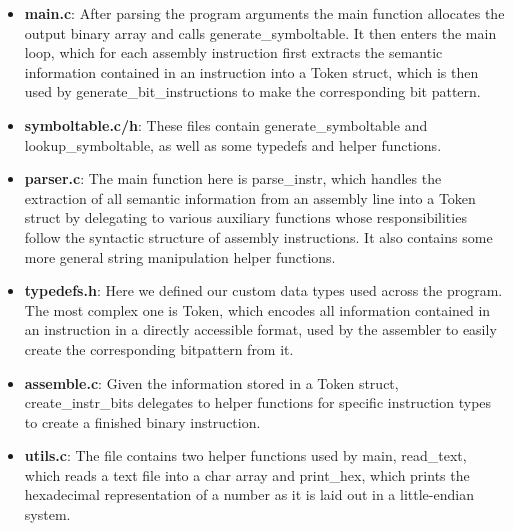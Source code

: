 \documentclass[10pt]{article}
\begin{document}
\begin{itemize}
\item \textbf{main.c}: After parsing the program arguments the main function allocates the output binary array and calls generate\_symboltable. It then enters the main loop, which for each assembly instruction first extracts the semantic information contained in an instruction into a Token struct, which is then used by generate\_bit\_instructions to make the corresponding bit pattern.
\item \textbf{symboltable.c/h}: These files contain generate\_symboltable and lookup\_symboltable, as well as some typedefs and helper functions.
\item \textbf{parser.c}: The main function here is parse\_instr, which handles the extraction of all semantic information from an assembly line into a Token struct by delegating to various auxiliary functions whose responsibilities follow the syntactic structure of assembly instructions. It also contains some more general string manipulation helper functions.
\item \textbf{typedefs.h}: Here we defined our custom data types used across the program. The most complex one is Token, which encodes all information contained in an instruction in a directly accessible format, used by the assembler to easily create the corresponding bitpattern from it.
\item \textbf{assemble.c}: Given the information stored in a Token struct, create\_instr\_bits delegates to helper functions for specific instruction types to create a finished binary instruction.
\item \textbf{utils.c}: The file contains two helper functions used by main, read\_text, which reads a text file into a char array and print\_hex, which prints the hexadecimal representation of a number as it is laid out in a little-endian system.

\end{itemize}
\end{document}
